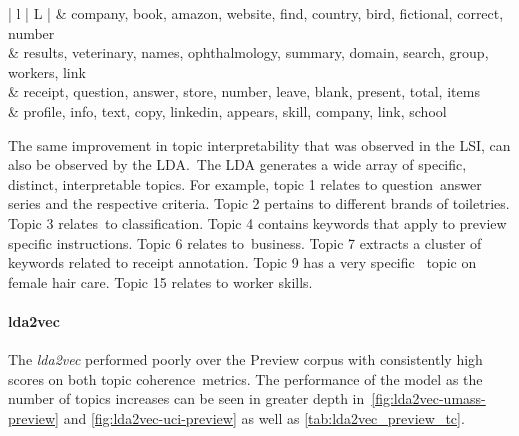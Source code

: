 \documentclass[letterpaper,12pt]{article}
\begin{document}
\begin{table}
\begin{center}
\begin{tabular}{| l | L |}
			 &                   company, book, amazon, website, find, country, bird, fictional, correct, number \\
			 &          results, veterinary, names, ophthalmology, summary, domain, search, group, workers, link \\
			 &                     receipt, question, answer, store, number, leave, blank, present, total, items \\
			 &                        profile, info, text, copy, linkedin, appears, skill, company, link, school \\
			\hline
		\end{tabular}
	\end{center}
\end{table}

The same improvement in topic interpretability that was observed in the LSI, can also be observed by the LDA.\
The LDA generates a wide array of specific, distinct, interpretable topics. For example, topic 1 relates to question\
answer series and the respective criteria. Topic 2 pertains to different brands of toiletries. Topic 3 relates\
to classification. Topic 4 contains keywords that apply to preview specific instructions. Topic 6 relates to\
business. Topic 7 extracts a cluster of keywords related to receipt annotation. Topic 9 has a very specific \
topic on female hair care. Topic 15 relates to worker skills.
\newpage

\paragraph{lda2vec}
The \emph{lda2vec} performed poorly over the Preview corpus with consistently high scores on both topic coherence\
metrics. The performance of the model as the number of topics increases can be seen in greater depth in\
\ref{fig:lda2vec-umass-preview} and \ref{fig:lda2vec-uci-preview} as well as \ref{tab:lda2vec_preview_tc}.
\end{document}

